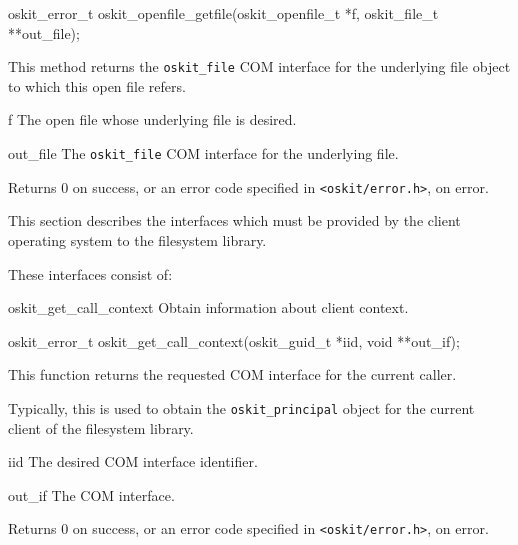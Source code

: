\begin{apisyn}

	\funcproto oskit_error_t
	oskit_openfile_getfile(oskit_openfile_t *f,
			      \outparam oskit_file_t **out_file);
\end{apisyn}
\ostofs
\begin{apidesc}
	This method returns the {\tt oskit_file} COM interface for
	the underlying file object to which this open file refers.
\end{apidesc}
\begin{apiparm}
	\item[f]
		The open file whose underlying file is desired.
	\item[out_file]
		The {\tt oskit_file} COM interface for the underlying file.
\end{apiparm}
\begin{apiret}
	Returns 0 on success, or an error code specified in
	{\tt <oskit/error.h>}, on error.
\end{apiret}



	This section describes the interfaces which must be provided
by the client operating system to the filesystem library.

	These interfaces consist of:
\begin{icsymlist}
\item[oskit_get_call_context]
	Obtain information about client context.
\end{icsymlist}

\begin{apisyn}

	\funcproto oskit_error_t
	oskit_get_call_context(oskit_guid_t *iid,
			      \outparam void **out_if);	
\end{apisyn}
\fstoos
\begin{apidesc}
	This function returns the requested COM interface
	for the current caller.

	Typically, this is used to obtain the {\tt oskit_principal}
	object for the current client of the filesystem library.	
\end{apidesc}
\begin{apiparm}
	\item[iid]
		The desired COM interface identifier.
	\item[out_if]
		The COM interface.
\end{apiparm}
\begin{apiret}
	Returns 0 on success, or an error code specified in
	{\tt <oskit/error.h>}, on error.
\end{apiret}

